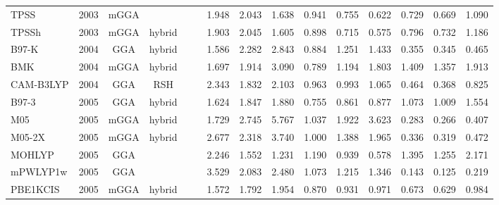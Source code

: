 \begin{landscape}
\begin{longtable}{ll:cccc:rrr:rrr:rrr}
    TPSS             & 2003 & mGGA &          &             &           & 1.948             & 2.043             & 1.638  & 0.941              & 0.755             & 0.622  & 0.729   & 0.669 & 1.090 \\
    TPSSh            & 2003 & mGGA & hybrid   &             &           & 1.903             & 2.045             & 1.605  & 0.898              & 0.715             & 0.575  & 0.796   & 0.732 & 1.186 \\
    B97-K            & 2004 & GGA  & hybrid   &             &           & 1.586             & 2.282             & 2.843  & 0.884              & 1.251             & 1.433  & 0.355   & 0.345 & 0.465 \\
    BMK              & 2004 & mGGA & hybrid   &             &           & 1.697             & 1.914             & 3.090  & 0.789              & 1.194             & 1.803  & 1.409   & 1.357 & 1.913 \\
    CAM-B3LYP        & 2004 & GGA  & RSH      &             &           & 2.343             & 1.832             & 2.103  & 0.963              & 0.993             & 1.065  & 0.464   & 0.368 & 0.825 \\
    B97-3            & 2005 & GGA  & hybrid   &             &           & 1.624             & 1.847             & 1.880  & 0.755              & 0.861             & 0.877  & 1.073   & 1.009 & 1.554 \\
    M05              & 2005 & mGGA & hybrid   &             &           & 1.729             & 2.745             & 5.767  & 1.037              & 1.922             & 3.623  & 0.283   & 0.266 & 0.407 \\
    M05-2X           & 2005 & mGGA & hybrid   &             &           & 2.677             & 2.318             & 3.740  & 1.000              & 1.388             & 1.965  & 0.336   & 0.319 & 0.472 \\
    MOHLYP           & 2005 & GGA  &          &             &           & 2.246             & 1.552             & 1.231  & 1.190              & 0.939             & 0.578  & 1.395   & 1.255 & 2.171 \\
    mPWLYP1w         & 2005 & GGA  &          &             &           & 3.529             & 2.083             & 2.480  & 1.073              & 1.215             & 1.346  & 0.143   & 0.125 & 0.219 \\
    PBE1KCIS         & 2005 & mGGA & hybrid   &             &           & 1.572             & 1.792             & 1.954  & 0.870              & 0.931             & 0.971  & 0.673   & 0.629 & 0.984 \\

\end{longtable}
\end{landscape}
